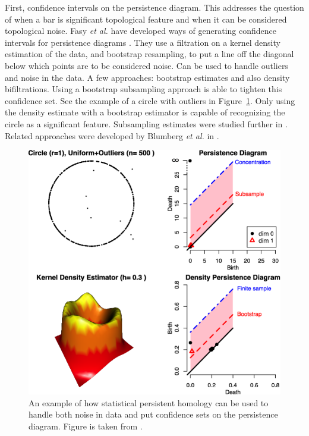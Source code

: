 First, confidence intervals on the persistence diagram.
This addresses the question of when a bar is significant topological feature and when it can be considered topological noise.
Fasy \emph{et al.} have developed ways of generating confidence intervals for persistence diagrams \citep{Fasy:2014}.
They use a filtration on a kernel density estimation of the data, and bootstrap resampling, to put a line off the diagonal below which points are to be considered noise.
Can be used to handle outliers and noise in the data.
A few approaches: bootstrap estimates and also density bifiltrations.
Using a bootstrap subsampling approach is able to tighten this confidence set.
See the example of a circle with outliers in Figure~\ref{fig:bg:fasy_confidence_set}.
Only using the density estimate with a bootstrap estimator is capable of recognizing the circle as a significant feature.
Subsampling estimates were studied further in \cite{Chazal:2014wp}.
Related approaches were developed by Blumberg \emph{et al.} in \cite{Blumberg:2014bq}.

\begin{figure}
\centering
\includegraphics[]{fig/background/fasy_confidence_set.pdf}
\caption[Statistical TDA]{An example of how statistical persistent homology can be used to handle both noise in data and put confidence sets on the persistence diagram. Figure is taken from \cite{Fasy:2014}.}
\label{fig:bg:fasy_confidence_set}
\end{figure}

